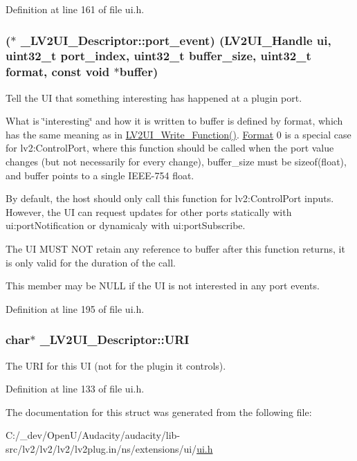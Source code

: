 Definition at line 161 of file ui.\+h.

\subsubsection[{\texorpdfstring{port\+\_\+event}{port_event}}]{($\ast$ \+\_\+\+L\+V2\+U\+I\+\_\+\+Descriptor\+::port\+\_\+event) ({\bf L\+V2\+U\+I\+\_\+\+Handle} ui, {\bf uint32\+\_\+t} port\+\_\+index, {\bf uint32\+\_\+t} buffer\+\_\+size, {\bf uint32\+\_\+t} {\bf format}, {\bf const} {\bf void} $\ast${\bf buffer})}\hypertarget{struct___l_v2_u_i___descriptor_a4991cb66395db96fbe83058f25c117de}{}\label{struct___l_v2_u_i___descriptor_a4991cb66395db96fbe83058f25c117de}
Tell the UI that something interesting has happened at a plugin port.

What is \char`\"{}interesting\char`\"{} and how it is written to {\ttfamily buffer} is defined by {\ttfamily format}, which has the same meaning as in \hyperlink{ui_8h_a62502987d06bc97ea88521aacc0990c9}{L\+V2\+U\+I\+\_\+\+Write\+\_\+\+Function()}. \hyperlink{class_format}{Format} 0 is a special case for lv2\+:Control\+Port, where this function should be called when the port value changes (but not necessarily for every change), {\ttfamily buffer\+\_\+size} must be sizeof(float), and {\ttfamily buffer} points to a single I\+E\+E\+E-\/754 float.

By default, the host should only call this function for lv2\+:Control\+Port inputs. However, the UI can request updates for other ports statically with ui\+:port\+Notification or dynamicaly with ui\+:port\+Subscribe.

The UI M\+U\+ST N\+OT retain any reference to {\ttfamily buffer} after this function returns, it is only valid for the duration of the call.

This member may be N\+U\+LL if the UI is not interested in any port events. 

Definition at line 195 of file ui.\+h.

\subsubsection[{\texorpdfstring{U\+RI}{URI}}]{ char$\ast$ \+\_\+\+L\+V2\+U\+I\+\_\+\+Descriptor\+::\+U\+RI}\hypertarget{struct___l_v2_u_i___descriptor_a939d783f0259577dd22df5c95c0372dc}{}\label{struct___l_v2_u_i___descriptor_a939d783f0259577dd22df5c95c0372dc}
The U\+RI for this UI (not for the plugin it controls). 

Definition at line 133 of file ui.\+h.



The documentation for this struct was generated from the following file\+:\begin{DoxyCompactItemize}
\item 
C\+:/\+\_\+dev/\+Open\+U/\+Audacity/audacity/lib-\/src/lv2/lv2/lv2/lv2plug.\+in/ns/extensions/ui/\hyperlink{ui_8h}{ui.\+h}\end{DoxyCompactItemize}
